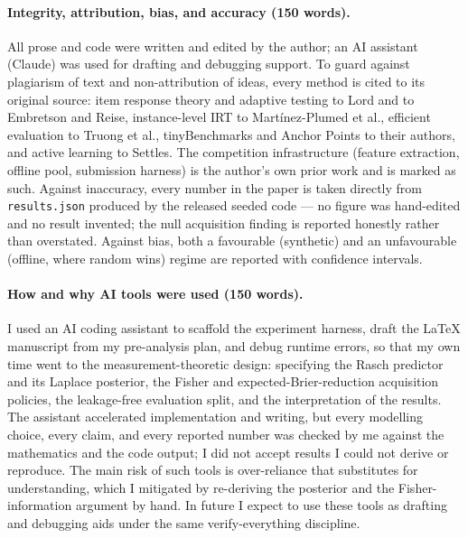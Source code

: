 \documentclass{article}
\begin{document}
\paragraph{Integrity, attribution, bias, and accuracy (150 words).}
All prose and code were written and edited by the author; an AI assistant
(Claude) was used for drafting and debugging support. To guard against
plagiarism of text and non-attribution of ideas, every method is cited to its
original source: item response theory and adaptive testing to Lord and to
Embretson and Reise, instance-level IRT to Mart\'inez-Plumed et al., efficient
evaluation to Truong et al., tinyBenchmarks and Anchor Points to their authors,
and active learning to Settles. The competition infrastructure (feature
extraction, offline pool, submission harness) is the author's own prior work and
is marked as such. Against inaccuracy, every number in the paper is taken
directly from \texttt{results.json} produced by the released seeded code --- no
figure was hand-edited and no result invented; the null acquisition finding is
reported honestly rather than overstated. Against bias, both a favourable
(synthetic) and an unfavourable (offline, where random wins) regime are reported
with confidence intervals.

\paragraph{How and why AI tools were used (150 words).}
I used an AI coding assistant to scaffold the experiment harness, draft the
\LaTeX{} manuscript from my pre-analysis plan, and debug runtime errors, so that
my own time went to the measurement-theoretic design: specifying the Rasch
predictor and its Laplace posterior, the Fisher and expected-Brier-reduction
acquisition policies, the leakage-free evaluation split, and the interpretation
of the results. The assistant accelerated implementation and writing, but every
modelling choice, every claim, and every reported number was checked by me
against the mathematics and the code output; I did not accept results I could
not derive or reproduce. The main risk of such tools is over-reliance that
substitutes for understanding, which I mitigated by re-deriving the posterior
and the Fisher-information argument by hand. In future I expect to use these
tools as drafting and debugging aids under the same verify-everything discipline.
\end{document}
